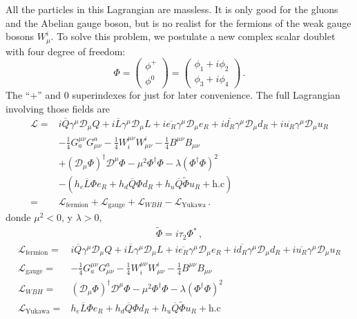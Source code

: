 \begin{frame}
All the particles in this Lagrangian are massless. It is only good for the gluons and the Abelian gauge boson, but is no realist for the fermions of the weak gauge bosons $W_\mu^i$. To solve this problem, we postulate a new complex scalar doublet with four degree of freedom:
\begin{equation}
  \Phi=
  \begin{pmatrix}
    \phi^+\\
    \phi^0
  \end{pmatrix}=
  \begin{pmatrix}
    \phi_1+i\phi_2\\
\phi_3+i\phi_4
  \end{pmatrix}\,.
\end{equation}
The ``+'' and 0 superindexes for just for later convenience.
The full Lagrangian involving those fields are 
\begin{align}
     \mathcal{L}=&i\overline{Q}\gamma^\mu\mathcal{D}_\mu Q+i\overline{L}\gamma^\mu\mathcal{D}_\mu L+
i\overline{e_R}\gamma^\mu\mathcal{D}_\mu {e_R}+i\overline{d_R}\gamma^\mu\mathcal{D}_\mu {d_R}+i\overline{u_R}\gamma^\mu\mathcal{D}_\mu {u_R}
\nonumber\\
     &-\tfrac{1}{4}G^{\mu\nu}_a G_{\mu\nu}^a-\tfrac{1}{4}W^{\mu\nu}_i W_{\mu\nu}^i-\tfrac{1}{4}B^{\mu\nu} B_{\mu\nu}\nonumber\\
     &+(\mathcal{D}_\mu\Phi)^\dagger\mathcal{D}^\mu\Phi-\mu^2\Phi^\dagger\Phi-\lambda(\Phi^\dagger\Phi)^2\nonumber\\
     &-(h_e\overline{L}\Phi e_R+h_d\overline{Q}\Phi d_R+h_u\overline{Q}\widetilde{\Phi}u_R+\text{h.c})\nonumber\\
     =&\mathcal{L}_{\text{fermion}}+\mathcal{L}_{\text{gauge}}
     +\mathcal{L}_{WBH}
     -\mathcal{L}_{\text{Yukawa}}\,.
\end{align}
donde $\mu^2<0$, y $\lambda>0$,
\begin{align}
  \widetilde{\Phi}=i\tau_2\Phi^*\,,
\end{align}
\begin{align}
  \label{eq:smscalar}
\mathcal{L}_{\text{fermion}}=&i\overline{Q}\gamma^\mu\mathcal{D}_\mu Q+i\overline{L}\gamma^\mu\mathcal{D}_\mu L+
i\overline{e_R}\gamma^\mu\mathcal{D}_\mu {e_R}+i\overline{d_R}\gamma^\mu\mathcal{D}_\mu {d_R}+i\overline{u_R}\gamma^\mu\mathcal{D}_\mu {u_R}\nonumber\\
\mathcal{L}_{\text{gauge}}=& -\tfrac{1}{4}G^{\mu\nu}_a G_{\mu\nu}^a-\tfrac{1}{4}W^{\mu\nu}_i W_{\mu\nu}^i-\tfrac{1}{4}B^{\mu\nu} B_{\mu\nu}\nonumber\\
  \mathcal{L}_{WBH}=&(\mathcal{D}_\mu\Phi)^\dagger\mathcal{D}^\mu\Phi-\mu^2\Phi^\dagger\Phi-\lambda(\Phi^\dagger\Phi)^2\nonumber\\
\mathcal{L}_{\text{Yukawa}}=&h_e\overline{L}\Phi e_R+h_d\overline{Q}\Phi d_R+h_u\overline{Q}\widetilde{\Phi}u_R+\text{h.c}
\end{align}



\end{frame}
